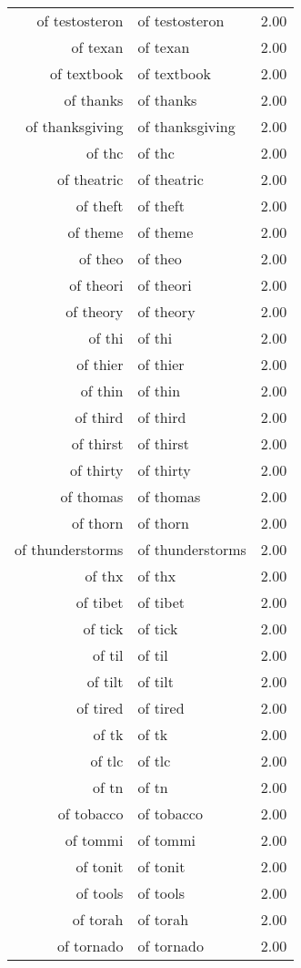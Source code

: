 \begin{table}[ht]
\begin{tabular}{rlr}
  of testosteron & of testosteron & 2.00 \\ 
  of texan & of texan & 2.00 \\ 
  of textbook & of textbook & 2.00 \\ 
  of thanks & of thanks & 2.00 \\ 
  of thanksgiving & of thanksgiving & 2.00 \\ 
  of thc & of thc & 2.00 \\ 
  of theatric & of theatric & 2.00 \\ 
  of theft & of theft & 2.00 \\ 
  of theme & of theme & 2.00 \\ 
  of theo & of theo & 2.00 \\ 
  of theori & of theori & 2.00 \\ 
  of theory & of theory & 2.00 \\ 
  of thi & of thi & 2.00 \\ 
  of thier & of thier & 2.00 \\ 
  of thin & of thin & 2.00 \\ 
  of third & of third & 2.00 \\ 
  of thirst & of thirst & 2.00 \\ 
  of thirty & of thirty & 2.00 \\ 
  of thomas & of thomas & 2.00 \\ 
  of thorn & of thorn & 2.00 \\ 
  of thunderstorms & of thunderstorms & 2.00 \\ 
  of thx & of thx & 2.00 \\ 
  of tibet & of tibet & 2.00 \\ 
  of tick & of tick & 2.00 \\ 
  of til & of til & 2.00 \\ 
  of tilt & of tilt & 2.00 \\ 
  of tired & of tired & 2.00 \\ 
  of tk & of tk & 2.00 \\ 
  of tlc & of tlc & 2.00 \\ 
  of tn & of tn & 2.00 \\ 
  of tobacco & of tobacco & 2.00 \\ 
  of tommi & of tommi & 2.00 \\ 
  of tonit & of tonit & 2.00 \\ 
  of tools & of tools & 2.00 \\ 
  of torah & of torah & 2.00 \\ 
  of tornado & of tornado & 2.00 \\ 

\end{tabular}
\end{table}
